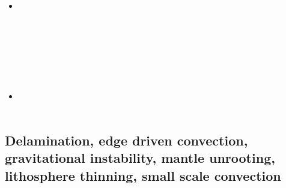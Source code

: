 \begin{scriptsize}
\begin{itemize}
\textcite{nigw18} \\
\textcite{bemc18} \\
\textcite{neew18} \\
\textcite{stbe18} \\
\item[\twothousandnineteen] 
\textcite{koen19} \\
\textcite{kipd19} \\
\textcite{crcm19} \\
\textcite{pedm19} \\
\textcite{mazz19} \\
\textcite{chch19} \\
\textcite{jart19} \\
\item[\twothousandtwenty] 
\textcite{yamq20} \\ 
\textcite{miko20} \\ 
\end{itemize}
\end{scriptsize}


\subsection{Delamination, edge driven convection, gravitational instability, mantle unrooting, lithosphere thinning, small scale convection} 

